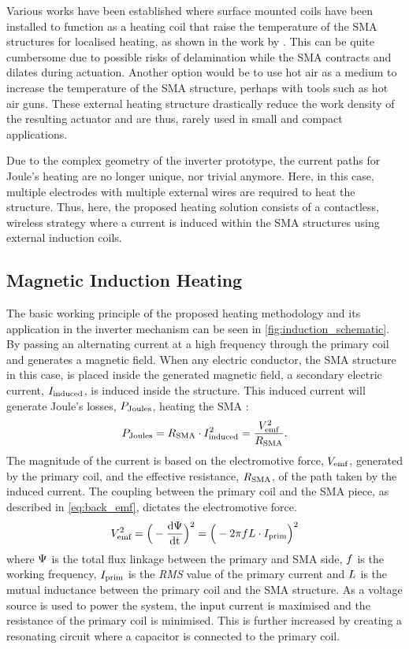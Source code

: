 Various works have been established where surface mounted coils have been installed to function as a heating coil that raise the temperature of the SMA structures for localised heating, as shown in the work by \cite{paikNovelLowprofileShape2010}. This can be quite cumbersome due to possible risks of delamination while the SMA contracts and dilates during actuation. Another option would be to use hot air as a medium to increase the temperature of the SMA structure, perhaps with tools such as hot air guns. These external heating structure drastically reduce the work density of the resulting actuator and are thus, rarely used in small and compact applications.

Due to the complex geometry of the inverter prototype, the current paths for Joule's heating are no longer unique, nor trivial anymore. Here, in this case, multiple electrodes with multiple external wires are required to heat the structure. Thus, here, the proposed heating solution consists of a contactless, wireless strategy where a current is induced within the SMA structures using external induction coils.
\subsection{Magnetic Induction Heating}
The basic working principle of the proposed heating methodology and its application in the inverter mechanism can be seen in \cref{fig:induction_schematic}. By passing an alternating current at a high frequency through the primary coil and generates a magnetic field. When any electric conductor, the SMA structure in this case, is placed inside the generated magnetic field, a secondary electric current, $I_\text{induced}$, is induced inside the structure. This induced current will generate Joule's losses, $P_\text{Joules}$, heating the SMA :
\begin{equation}
    P_\text{Joules} = R_\text{SMA} \cdot I_\text{induced}^2 = \frac{V_\text{emf}^2}{R_\text{SMA}}.
\end{equation}
The magnitude of the current is based on the electromotive force, $V_\text{emf}$, generated by the primary coil, and the effective resistance, $R_\text{SMA}$, of the path taken by the induced current. The coupling between the primary coil and the SMA piece, as described in \cref{eq:back_emf}, dictates the electromotive force.
\begin{equation}
    \label{eq:back_emf}
    V_\text{emf}^2 = \Big(-\frac{\text{d}\Psi}{\text{dt}}\Big)^2 = \Big(- 2\pi f L \cdot I_\text{prim} \Big)^2
\end{equation}
where $\Psi$ is the total flux linkage between the primary and SMA side, $f$ is the working frequency, $I_\text{prim}$ is the \textit{RMS} value of the primary current and $L$ is the mutual inductance between the primary coil and the SMA structure. As a voltage source is used to power the system, the input current is maximised and the resistance of the primary coil is minimised. This is further increased by creating a resonating circuit where a capacitor is connected to the primary coil.


